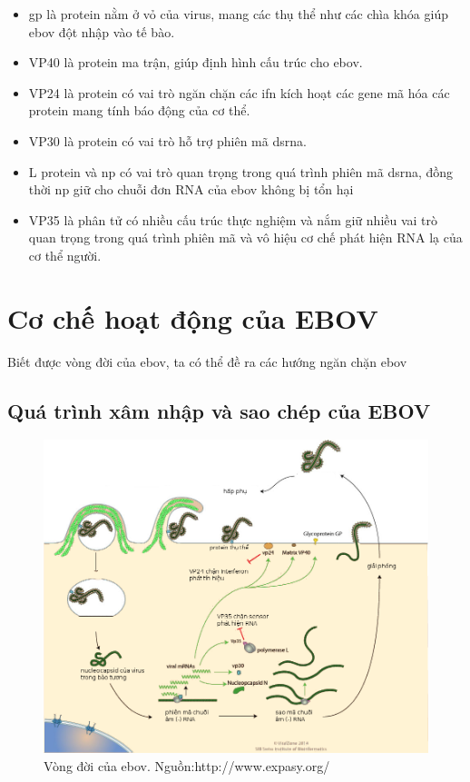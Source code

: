 \documentclass[12pt,a4paper,reqno, oneside]{book}
\begin{document}
	\begin{itemize}
	\item \gls{gp} là protein nằm ở vỏ của virus, mang các thụ thể như các chìa khóa giúp \gls{ebov} đột nhập vào tế bào\cite{Johnson2006, Lee2009}.
	\item VP40 là protein ma trận, giúp định hình cấu trúc cho \gls{ebov}\cite{Dessen2000, Noda2002}.
	\item VP24 là protein có vai trò ngăn chặn các \gls{ifn} kích hoạt các gene mã hóa các protein mang tính báo động của cơ thể\cite{Reid2006}.
	\item VP30 là protein có vai trò hỗ trợ phiên mã \gls{dsrna}\cite{Weik2002}.
	\item L protein và \gls{np}\cite{Feldmann2003,Dziubanska:be5269} có vai trò quan trọng trong quá trình phiên mã \gls{dsrna}, đồng thời \gls{np} giữ cho chuỗi đơn RNA của \gls{ebov} không bị tổn hại\cite{Dziubanska:be5269}
	\item VP35 là phân tử có nhiều cấu trúc thực nghiệm và nắm giữ nhiều vai trò quan trọng trong quá trình phiên mã và vô hiệu cơ chế phát hiện RNA lạ của cơ thể người\cite{Muhlberger1999,Basler2000,Basler2003,Enterlein2006,Feng2007,Prins2009}.
	\end{itemize}

\section{Cơ chế hoạt động của EBOV}
Biết được vòng đời của \gls{ebov}, ta có thể đề ra các hướng ngăn chặn \gls{ebov}
\subsection{Quá trình xâm nhập và sao chép của EBOV}
		\begin{figure}[t!]
		\centering
		\includegraphics[width=1.0\textwidth,natwidth=610,natheight=642]{Ebolavirus_cycle.png}
		\caption{Vòng đời của \gls{ebov}. Nguồn:http://www.expasy.org/}
		\label{fig:viruscycle}
		\end{figure}
\end{document}
